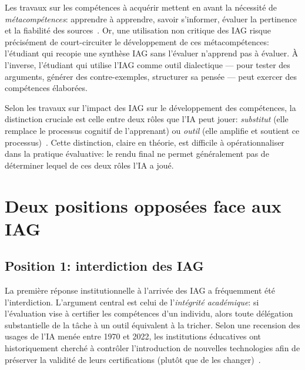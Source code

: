 Les travaux sur les comp\'etences \`a acqu\'erir mettent en avant la n\'ecessit\'e de \emph{m\'etacomp\'etences}: apprendre \`a apprendre, savoir s'informer, \'evaluer la pertinence et la fiabilit\'e des sources~\cite{competenceshal2023}. 
Or, une utilisation non critique des IAG risque pr\'ecis\'ement de court-circuiter le d\'eveloppement de ces m\'etacomp\'etences: l'\'etudiant qui recopie une synth\`ese IAG sans l'\'evaluer n'apprend pas \`a \'evaluer. 
\`A l'inverse, l'\'etudiant qui utilise l'IAG comme outil dialectique --- pour tester des arguments, g\'en\'erer des contre-exemples, structurer sa pens\'ee --- peut exercer des comp\'etences \'elabor\'ees.

Selon les travaux sur l'impact des IAG sur le d\'eveloppement des comp\'etences, la distinction cruciale est celle entre deux r\^oles que l'IA peut jouer: \emph{substitut} (elle remplace le processus cognitif de l'apprenant) ou \emph{outil} (elle amplifie et soutient ce processus)~\cite{impactIAGcompetences2022}. 
Cette distinction, claire en th\'eorie, est difficile \`a op\'erationnaliser dans la pratique \'evaluative: le rendu final ne permet g\'en\'eralement pas de d\'eterminer lequel de ces deux r\^oles l'IA a jou\'e.


\newpage
\section{Deux positions oppos\'ees face aux IAG}\label{sec:positions}

\subsection*{Position 1: interdiction des IAG}

La premi\`ere r\'eponse institutionnelle \`a l'arriv\'ee des IAG a fr\'equemment \'et\'e l'interdiction. 
L'argument central est celui de l'\emph{int\'egrit\'e acad\'emique}: si l'\'evaluation vise \`a certifier les comp\'etences d'un individu, alors toute d\'el\'egation substantielle de la t\^ache \`a un outil \'equivalent \`a la tricher. 
Selon une recension des usages de l'IA men\'ee entre 1970 et 2022, les institutions \'educatives ont historiquement cherch\'e \`a contr\^oler l'introduction de nouvelles technologies afin de pr\'eserver la validit\'e de leurs certifications (plut\^ot que de les changer)~\cite{rolesenseignantIA2023}.

